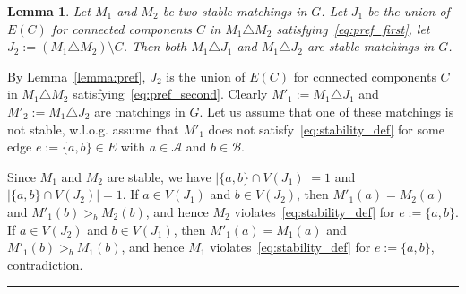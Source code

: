 \documentclass[preprint]{elsarticle}
\newtheorem{lemma}[fact]{Lemma}
\newenvironment{proof}{{\bf Proof:  }}{\hfill\rule{2mm}{2mm}}
\begin{document}
\begin{lemma}\label{lemma:sym_stable} 
Let $M_1$ and $M_2$ be two stable matchings in $G$. Let $J_1$ be the union of $E(C)$ for connected components $C$ in $M_1 \triangle M_2$ satisfying~\eqref{eq:pref_first}, let $J_2:=(M_1\triangle M_2)\setminus C$. Then both $M_1\triangle J_1$ and $M_1\triangle J_2$ are stable matchings in $G$.
\end{lemma}
\begin{proof}
By Lemma~\ref{lemma:pref}, $J_2$ is the union of $E(C)$ for connected components $C$ in $M_1 \triangle M_2$ satisfying~\eqref{eq:pref_second}. Clearly $M'_1:=M_1\triangle J_1$ and $M'_2:=M_1\triangle J_2$ are matchings in $G$. Let us assume that one of these matchings is not stable, w.l.o.g. assume that $M'_1$ does not satisfy~\eqref{eq:stability_def} for some edge $e:=\{a,b\}\in E$ with $a\in\mathcal{A}$ and $b\in\mathcal{B}$. 

Since $M_1$ and $M_2$ are stable, we have $|\{a,b\}\cap V(J_1)|=1$ and $|\{a,b\}\cap V(J_2)|=1$.
If $a\in V(J_1)$ and $b\in V(J_2)$, then $M'_1(a)=M_2(a)$ and $M'_1(b)>_b M_2(b)$, and hence $M_2$ violates~\eqref{eq:stability_def} for $e:=\{a,b\}$. If $a\in V(J_2)$ and $b\in V(J_1)$, then $M'_1(a)=M_1(a)$ and $M'_1(b)>_b M_1(b)$, and hence $M_1$ violates~\eqref{eq:stability_def} for $e:=\{a,b\}$, contradiction.
\end{proof}
\end{document}
